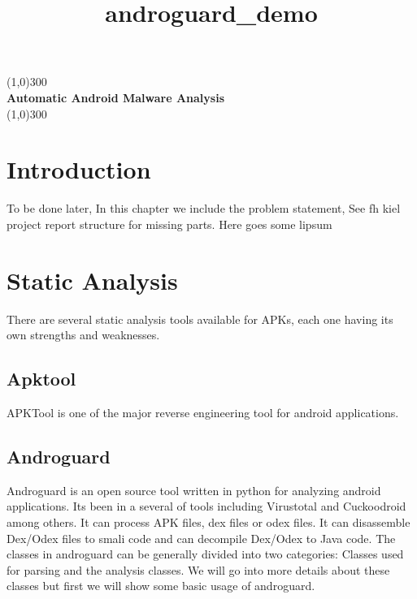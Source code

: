\documentclass{article}
\title{androguard\_demo}
\begin{document}
	\begin{titlepage}
		\begin{center}
			\line(1,0){300}\\
			\huge{\bfseries Automatic Android Malware Analysis}\\
			\line(1,0){300}\\
		\end{center}
	\end{titlepage}
	
	
	\section{Introduction}\label{sec:intro}
		\lipsum[1]
		\lipsum[1]
		\lipsum[1]
		To be done later, In this chapter we include the problem statement, See fh kiel project report structure for missing parts. Here goes some lipsum
		\lipsum
		
		\pagebreak
		
	\section{Static Analysis}\label{sec:static_analysis}
		There are several static analysis tools available for APKs, each one having its own strengths and weaknesses.
	
		
		\lipsum[1]
			\subsection{Apktool}\label{sec:apktool}
			APKTool is one of the major reverse engineering tool for android applications. 
			\lipsum[2]
			\subsection{Androguard}\label{sec:androguard}
			Androguard is an open source tool written in python for analyzing android applications. Its been in a several of tools including Virustotal and Cuckoodroid among others. It can process APK files, dex files or odex files. It can disassemble Dex/Odex files to smali code and can decompile Dex/Odex to Java code. The classes in androguard can be generally divided into two categories: Classes used for parsing and the analysis classes. We will go into more details about these classes but first we will show some basic usage of androguard.
			
\end{document}
